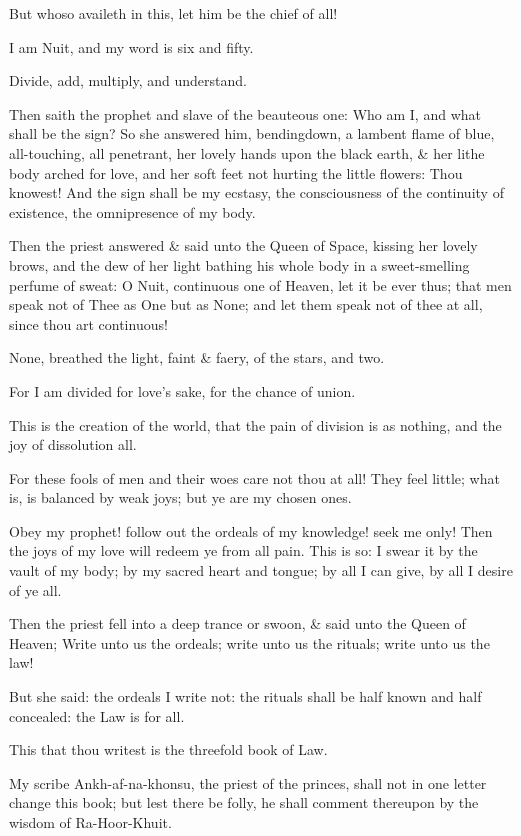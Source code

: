 But whoso availeth in this, let him be the chief of all!

I am Nuit, and my word is six and fifty.

Divide, add, multiply, and understand.

Then saith the prophet and slave of the beauteous one: Who am I, and what shall be the sign? So she answered him, bendingdown, a lambent flame of blue, all-touching, all penetrant, her lovely hands upon the black earth, & her lithe body arched for love, and her soft feet not hurting the little flowers: Thou knowest! And the sign shall be my ecstasy, the consciousness of the continuity of existence, the omnipresence of my body.

Then the priest answered & said unto the Queen of Space, kissing her lovely brows, and the dew of her light bathing his whole body in a sweet-smelling perfume of sweat: O Nuit, continuous one of Heaven, let it be ever thus; that men speak not of Thee as One but as None; and let them speak not of thee at all, since thou art continuous!

None, breathed the light, faint & faery, of the stars, and two.

For I am divided for love's sake, for the chance of union.

This is the creation of the world, that the pain of division is as nothing, and the joy of dissolution all.

For these fools of men and their woes care not thou at all! They feel little; what is, is balanced by weak joys; but ye are my chosen ones.

Obey my prophet! follow out the ordeals of my knowledge! seek me only! Then the joys of my love will redeem ye from all pain. This is so: I swear it by the vault of my body; by my sacred heart and tongue; by all I can give, by all I desire of ye all.

Then the priest fell into a deep trance or swoon, & said unto the Queen of Heaven; Write unto us the ordeals; write unto us the rituals; write unto us the law!

But she said: the ordeals I write not: the rituals shall be half known and half concealed: the Law is for all.

This that thou writest is the threefold book of Law.

My scribe Ankh-af-na-khonsu, the priest of the princes, shall not in one letter change this book; but lest there be folly, he shall comment thereupon by the wisdom of Ra-Hoor-Khuit.

